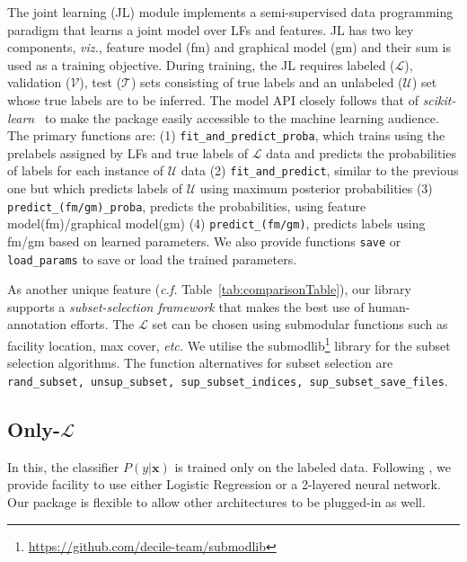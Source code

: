 \documentclass[11pt]{article}
\newcommand{\Ucal}{\mathcal{U}}
\newcommand{\Lcal}{\mathcal{L}}
\newcommand{\Vcal}{\mathcal{V}}
\newcommand{\Tcal}{\mathcal{T}}
\newcommand{\bfx}{\mathbf x}
\begin{document}
The joint learning (JL) module implements a semi-supervised data programming paradigm that learns a joint model over LFs and features. JL has two key components, {\em viz.}, feature model (fm) and graphical model (gm) and their sum is used as a training objective.
During training, the JL requires labeled ($\Lcal$), validation ($\Vcal$), test ($\Tcal$) sets consisting of true labels and an unlabeled ($\Ucal$) set whose true labels are to be inferred. The model API closely follows that of \textit{scikit-learn}~\citep{pedregosa2011scikit} to make the package easily accessible to the machine learning audience. The primary functions are: (1) \texttt{fit\_and\_predict\_proba}, which trains using the prelabels assigned by LFs and true labels of $\Lcal$ data and predicts the probabilities of labels for each instance of $\Ucal$ data 
(2) \texttt{fit\_and\_predict}, similar to the previous one but which predicts labels of $\Ucal$ using maximum posterior probabilities 
(3) \texttt{predict\_(fm/gm)\_proba}, predicts the probabilities, using feature model(fm)/graphical model(gm) 
(4) \texttt{predict\_(fm/gm)}, predicts labels using fm/gm based on learned parameters.
We also provide functions \texttt{save} or \texttt{load\_params} to save or load the trained parameters.


As another unique feature ({\em c.f.} Table~\ref{tab:comparisonTable}), our library supports a \textit{subset-selection framework} that makes the best use of human-annotation efforts. The $\Lcal$ set can be chosen using submodular functions such as facility location, max cover, { \em etc.} We utilise the submodlib\footnote{\url{https://github.com/decile-team/submodlib}} library for the subset selection algorithms.
The function alternatives for subset selection are \texttt{rand\_subset, unsup\_subset, sup\_subset\_indices, sup\_subset\_save\_files}. 
\subsection{Only-$\Lcal$}
In this, the classifier $P(y|\bfx)$ is trained only on the labeled data. Following \citet{spear}, we provide facility to  use either Logistic Regression or a 2-layered neural network. Our package is flexible to allow other architectures to be plugged-in as well.
\end{document}
